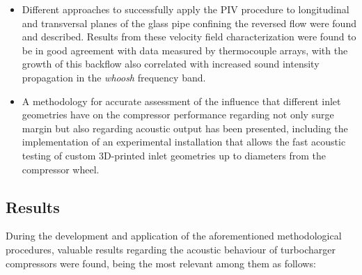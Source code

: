 \begin{itemize}
	\item Different approaches to successfully apply the PIV procedure to longitudinal and transversal planes of the glass pipe confining the reversed flow were found and described. Results from these velocity field characterization were found to be in good agreement with data measured by thermocouple arrays, with the growth of this backflow also correlated with increased  sound intensity propagation in the \emph{whoosh} frequency band.

	\item A methodology for accurate assessment of the influence that different inlet geometries have on the compressor performance regarding not only surge margin but also regarding acoustic output has been presented, including the implementation of an experimental installation that allows the fast acoustic testing of custom 3D-printed inlet geometries up to  diameters from the compressor wheel.

\end{itemize}

\subsection{Results}

During the development and application of the aforementioned methodological procedures, valuable results regarding the acoustic behaviour of turbocharger compressors were found, being the most relevant among them as follows:

